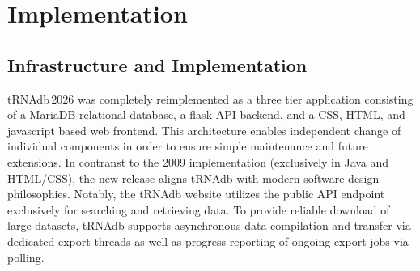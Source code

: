 \documentclass[unnumsec,webpdf,contemporary,large]{oup-authoring-template}
\begin{document}
%
%








\section{Implementation}

\subsection{Infrastructure and Implementation}

tRNAdb\,2026 was completely reimplemented as a three tier application
consisting of a MariaDB relational database, a flask API backend, and a
CSS, HTML, and javascript based web frontend. This architecture enables
independent change of individual components in order to ensure simple
maintenance and future extensions. In contranst to the 2009 implementation
(exclusively in Java and HTML/CSS), the new release aligns tRNAdb
with modern software design philosophies. Notably, the tRNAdb website
utilizes the public API endpoint exclusively for searching and retrieving
data. To provide reliable download of large datasets, tRNAdb supports
asynchronous data compilation and transfer via dedicated export threads as
well as progress reporting of ongoing export jobs via polling.
\end{document}
